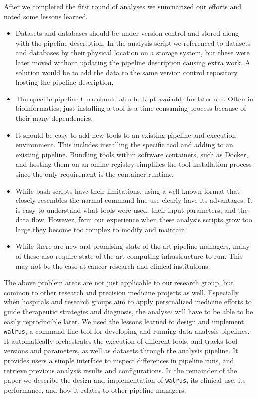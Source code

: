 After we completed the first round of analyses we summarized our efforts and
noted some lessons learned. 
\begin{itemize}
    \item  Datasets and databases should be under version control and stored
        along with the pipeline description. In the analysis script we
        referenced to datasets and databases by their physical location on a
        storage system, but these were later moved without updating the pipeline
        description causing extra work. A solution would be to add the data to
        the same version control repository hosting the pipeline description.
    \item The specific pipeline tools should also be kept available for
        later use. Often in bioinformatics, just installing a tool is a
        time-consuming process because of their many dependencies. 
    \item It should be easy to add new tools to an existing
        pipeline and execution environment. This includes installing the specific
        tool and adding to an existing pipeline. Bundling tools within software
        containers, such as Docker, and hosting them on an online registry
        simplifies the tool installation process since the only requirement is
        the container runtime.
    \item While bash scripts have their
        limitations, using a well-known format that closely resembles the normal
        command-line use clearly have its advantages. It is easy to understand
        what tools were used, their input parameters, and the data flow.
        However, from our experience when these analysis scripts grow too large
        they become too complex to modify and maintain. 
    \item While there are new and promising state-of-the art pipeline
        managers, many of these also require state-of-the-art computing
        infrastructure to run. This may not be the case at cancer research
        and clinical institutions. 
\end{itemize} 


The above problem areas are not just applicable to our research group, but
common to other research and precision medicine projects as well. Especially
when hospitals and research groups aim to apply personalized medicine efforts to
guide therapeutic strategies and diagnosis, the analyses will have to be able to
be easily reproducible later. We used the lessons learned to  design and
implement \texttt{walrus}, a command line tool for developing and running data
analysis pipelines. It automatically orchestrates the execution of different
tools, and tracks tool versions and parameters, as well as datasets through the
analysis pipeline. It provides users a simple interface to inspect differences
in pipeline runs, and retrieve previous analysis results and configurations. In
the remainder of the paper we describe the design and implementation of
\texttt{walrus}, its clinical use, its performance, and how it relates to other
pipeline managers. 

